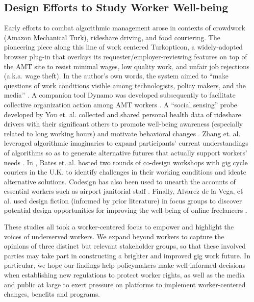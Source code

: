 \subsection{Design Efforts to Study Worker Well-being}
Early efforts to combat algorithmic management arose in contexts of crowdwork (Amazon Mechanical Turk), rideshare driving, and food couriering. The pioneering piece along this line of work centered Turkopticon, a widely-adopted browser plug-in that overlays its requester/employer-reviewing features on top of the AMT site to resist minimal wages, low quality work, and unfair job rejections (a.k.a. wage theft). In the author's own words, the system aimed to ``make questions of work conditions visible among technologists, policy makers, and the media'' \cite{turkopticon}. A companion tool Dynamo was developed subsequently to facilitate collective organization action among AMT workers \cite{dynamo}. A ``social sensing'' probe developed by You et. al. collected and shared personal health data of rideshare drivers with their significant others to promote well-being awareness (especially related to long working hours) and motivate behavioral changes \cite{you2021go}. Zhang et. al. leveraged algorithmic imaginaries to expand participants' current understandings of algorithms so as to generate alternative futures that actually support workers' needs \cite{zhang2022algorithmic}. In \cite{bates2021lessons}, Bates et. al. hosted two rounds of co-design workshops with gig cycle couriers in the U.K. to identify challenges in their working conditions and ideate alternative solutions. Codesign has also been used to unearth the accounts of essential workers such as airport janitorial staff \cite{kang2022stories}. Finally, Alvarez de la Vega, et al. used design fiction (informed by prior literature) in focus groups to discover potential design opportunities for improving the well-being of online freelancers \cite{alvarez2022design}.

These studies all took a worker-centered focus to empower and highlight the voices of underserved workers. We expand beyond workers to capture the opinions of three distinct but relevant stakeholder groups, so that these involved parties may take part in constructing a brighter and improved gig work future. In particular, we hope our findings help policymakers make well-informed decisions when establishing new regulations to protect worker rights, as well as the media and public at large to exert pressure on platforms to implement worker-centered changes, benefits and programs.

